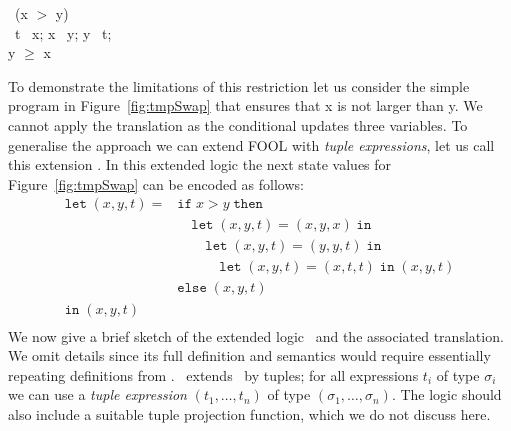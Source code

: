 \begin{figure*}[tb]
  \vspace{-1em}
  \begin{center}
    \parbox{0cm}{
      \begin{tabbing}
        \IF\ (x $>$ y) \\\inc
        \THEN\ t \ass\ x; x \ass\ y; y \ass\ t;\\\dec
         y $\geq$ x
      \end{tabbing}
    }
  \end{center}
  \vspace*{-2em}
  \caption{Updating multiple variables.\label{fig:tmpSwap}}
\end{figure*}

To demonstrate the limitations of this restriction let us consider the simple program in Figure~\ref{fig:tmpSwap} that ensures that x is not larger than y. We cannot apply the translation as the conditional updates three variables. To generalise the approach we can extend FOOL with \emph{tuple expressions}, let us call this extension \foolp. In this extended logic the next state values for Figure~\ref{fig:tmpSwap} can be encoded as follows:
%
\[
\begin{array}{ll}
\mathtt{let}\; (x,y,t) =& \mathtt{if}\; x > y \;\mathtt{then} \\
&\quad\mathtt{let}\; (x,y,t) = (x,y,x) \;\mathtt{in}\\
&\quad\quad\mathtt{let}\; (x,y,t) = (y,y,t) \;\mathtt{in}\\
&\quad\quad\quad\mathtt{let}\;(x,y,t) = (x,t,t)  \;\mathtt{in}\; (x,y,t) \\
&\mathtt{else}\; (x,y,t)\\
\mathtt{in}\; (x,y,t) \\
\end{array}
\]
%
We now give a brief sketch of the extended logic \foolp\ and the associated translation. We omit details since its full definition and semantics would require essentially repeating definitions from \cite{FOOL}.  \foolp\ extends \fool\ by tuples; for all expressions $t_i$ of type $\sigma_i$ we can use a \emph{tuple expression} $(t_1,\ldots,t_n)$ of type $(\sigma_1,\ldots,\sigma_n)$. The logic should also include a suitable tuple projection function, which we do not discuss here.

